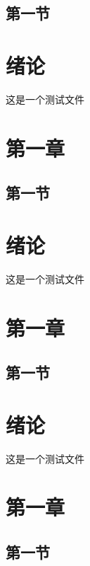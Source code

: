\subsection{第一节}
\section{绪论}
这是一个测试文件
\section{第一章}
\subsection{第一节}
\section{绪论}
这是一个测试文件
\section{第一章}
\subsection{第一节}
\section{绪论}
这是一个测试文件
\section{第一章}
\subsection{第一节}